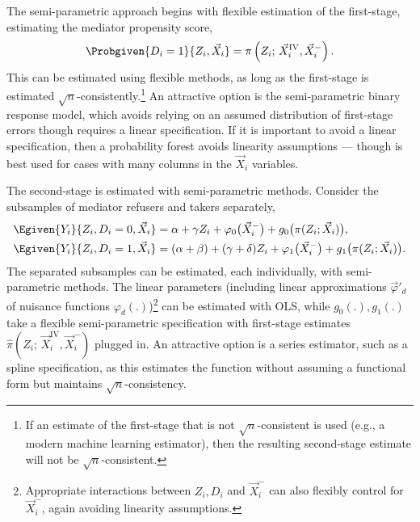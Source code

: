 The semi-parametric approach begins with flexible estimation of the first-stage, estimating the mediator propensity score,
\[ \Probgiven{D_i = 1}{Z_i, \vec X_i}
    = \pi\left(Z_i; \,\vec X_i ^{\mathrm{IV}}, \vec X_i^- \right). \]
This can be estimated using flexible methods, as long as the first-stage is estimated $\sqrt{n}$-consistently.\footnote{
    If an estimate of the first-stage that is not $\sqrt{n}$-consistent is used (e.g., a modern machine learning estimator), then the resulting second-stage estimate will not be $\sqrt{n}$-consistent.
}
An attractive option is the \cite{klein1993efficient} semi-parametric binary response model, which avoids relying on an assumed distribution of first-stage errors though requires a linear specification.
If it is important to avoid a linear specification, then a probability forest avoids linearity assumptions \citep{athey2019generalized} --- though is best used for cases with many columns in the $\vec X_i$ variables.

The second-stage is estimated with semi-parametric methods.
Consider the subsamples of mediator refusers and takers separately,
\begin{align*}
    \Egiven{Y_i}{Z_i, D_i = 0, \vec X_i} &=
        \alpha + \gamma Z_i + \varphi_0\big( \vec X_i^- \big)
        + g_0 \big( \pi(Z_i ; \vec X_i) \big), \\
    \Egiven{Y_i}{Z_i, D_i = 1, \vec X_i} &=
        (\alpha + \beta) + (\gamma + \delta) Z_i + \varphi_1\big( \vec X_i^- \big)
        + g_1 \big( \pi(Z_i ; \vec X_i) \big).
\end{align*}
The separated subsamples can be estimated, each individually, with semi-parametric methods.
The linear parameters (including linear approximations $\vec \varphi'_{d}$ of nuisance functions $\varphi_{d}(.)$)\footnote{
    Appropriate interactions between $Z_i, D_i$ and $\vec X_i^-$ can also flexibly control for $\vec X_i^-$, again avoiding linearity assumptions.
}
can be estimated with OLS, while $g_0(.), g_1(.)$ take a flexible semi-parametric specification with first-stage estimates $\hat \pi(Z_i; \,\vec X_i ^{\mathrm{IV}}, \vec X_i^-)$ plugged in.
An attractive option is a series estimator, such as a spline specification, as this estimates the function without assuming a functional form but maintains $\sqrt n$-consistency.

